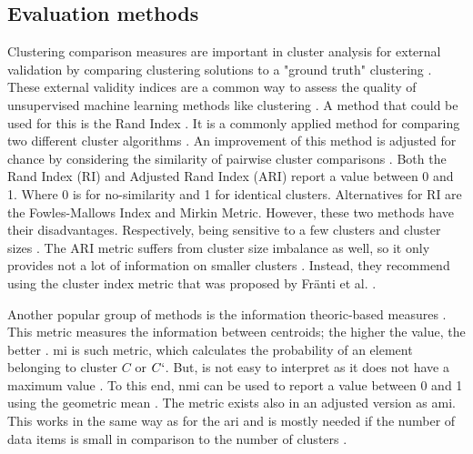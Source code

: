 \subsection{Evaluation methods} \label{theory:evaluate}
Clustering comparison measures are important in cluster analysis for external validation by comparing clustering solutions to a "ground truth" clustering \citep{vinh_information_nodate-2}.
These external validity indices are a common way to assess the quality of unsupervised machine learning methods like clustering \citep{warrens_understanding_2022}.
A method that could be used for this is the Rand Index \citep{rand_objective_1971}.
It is a commonly applied method for comparing two different cluster algorithms \citep{wagner_comparing_nodate}.
An improvement of this method is adjusted for chance by considering the similarity of pairwise cluster comparisons \citep{vinh_information_nodate-2}.
Both the Rand Index (RI) and Adjusted Rand Index (ARI) \citep{hubert_comparing_1985-1} report a value between 0 and 1.
Where 0 is for no-similarity and 1 for identical clusters.
Alternatives for RI are the Fowles-Mallows Index and Mirkin Metric.
However, these two methods have their disadvantages. Respectively, being sensitive to a few clusters and cluster sizes \citep{wagner_comparing_nodate}.
The ARI metric suffers from cluster size imbalance as well, so it only provides not a lot of information on smaller clusters \citep{warrens_understanding_2022}.
Instead, they recommend using the cluster index metric that was proposed by Fränti et al. \citep{franti_centroid_2014}.

Another popular group of methods is the information theoric-based measures \citep{vinh_information_nodate-2}.
This metric measures the information between centroids; the higher the value, the better \citep{vinh_information_nodate-2}.
\gls{mi} is such metric, which calculates the probability of an element belonging to cluster $C$ or $C`$.
But, is not easy to interpret as it does not have a maximum value \citep{wagner_comparing_nodate}.
To this end, \gls{nmi} can be used to report a value between 0 and 1 using the geometric mean \citep{strehl_cluster_2002}.
The metric exists also in an adjusted version as \gls{ami}.
This works in the same way as for the \gls{ari} and is mostly needed if the number of data items is small in comparison to the number of clusters \citep{vinh_information_nodate-2}. \newline

